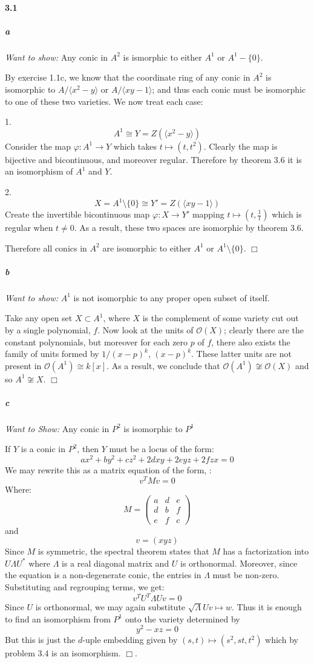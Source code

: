 \documentclass{article}
\begin{document}
\paragraph{3.1}

\subparagraph{a}
\emph{Want to show:} Any conic in $A^2$ is ismorphic to either $A^1$ or $A^1 - \{ 0 \}$.

By exercise 1.1c, we know that the coordinate ring of any conic in $A^2$ is isomorphic to $A / \langle x^2 - y \rangle$ or $A / \langle x y  - 1 \rangle$; and thus each conic must be isomorphic to one of these two varieties.  We now treat each case:

1.
\[ A^1 \cong Y = Z ( \langle x^2 - y \rangle ) \]
Consider the map $\varphi : A^1 \to Y$ which takes $t \mapsto (t,t^2)$.  Clearly the map is bijective and bicontinuous, and moreover regular.  Therefore by theorem 3.6 it is an isomorphism of $A^1$ and $Y$.

2.
\[ X = A^1 \setminus \{ 0 \} \cong Y' = Z( \langle x y - 1 \rangle ) \]
Create the invertible bicontinuous map $\varphi : X \to Y'$ mapping $t \mapsto (t, \frac{1}{t})$ which is regular when $t \neq 0$.  As a result, these two spaces are isomorphic by theorem 3.6.

Therefore all conics in $A^2$ are isomorphic to either $A^1$ or $A^1 \setminus \{ 0 \}$. $\Box$

\subparagraph{b}
\emph{Want to show:} $A^1$ is not isomorphic to any proper open subset of itself.

Take any open set $X \subset A^1$, where $X$ is the complement of some variety cut out by a single polynomial, $f$.  Now look at the units of $\mathcal{O}(X)$; clearly there are the constant polynomials, but moreover for each zero $p$ of $f$, there also exists the family of units formed by $1 / (x - p)^k$, $(x - p)^k$.  These latter units are not present in $\mathcal{O}(A^1) \cong k[x]$.  As a result, we conclude that $\mathcal{O}(A^1) \not \cong \mathcal{O}(X)$ and so $A^1 \not \cong X$.  $\Box$


\subparagraph{c}
\emph{Want to Show:} Any conic in $P^2$ is isomorphic to $P^1$

If $Y$ is a conic in $P^2$, then $Y$ must be a locus of the form:
\[ a x^2 + b y^2 + c z^2 + 2d xy + 2e yz + 2f zx = 0\]
We may rewrite this as a matrix equation of the form, :
\[ v^T M v = 0 \]
Where:
\[ M = \left( \begin{array}{ccc}
a & d & e \\
d & b & f \\
e & f & c \end{array} \right) \]
and
\[ v = ( x y z ) \]
Since $M$ is symmetric, the spectral theorem states that $M$ has a factorization into $U \Lambda U^*$ where $\Lambda$ is a real diagonal matrix and $U$ is orthonormal.  Moreover, since the equation is a non-degenerate conic, the entries in $\Lambda$ must be non-zero.  Substituting and regrouping terms, we get:
\[ v^T U^T \Lambda U v = 0 \]
Since $U$ is orthonormal, we may again substitute $\sqrt{\Lambda} U v \mapsto w$.  Thus it is enough to find an isomorphism from $P^1$ onto the variety determined by
\[ y^2 - xz = 0 \]
But this is just the $d$-uple embedding given by $(s,t) \mapsto (s^2, st, t^2)$ which by problem 3.4 is an isomorphism. $\Box$.
\end{document}
